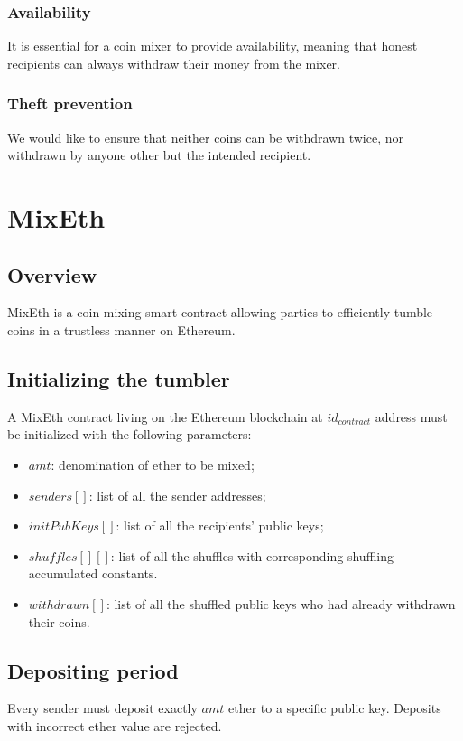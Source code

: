 \documentclass[a4paper]{article}
\theoremstyle{definition}
\begin{document}
\subsubsection{Availability}
It is essential for a coin mixer to provide availability, meaning that honest recipients can always withdraw their money from the mixer.


\subsubsection{Theft prevention}
We would like to ensure that neither coins can be withdrawn twice, nor withdrawn by anyone other but the intended recipient. 
\section{MixEth}

\subsection{Overview}
MixEth is a coin mixing smart contract allowing parties to efficiently tumble coins in a trustless manner on Ethereum.
\subsection{Initializing the tumbler}

A MixEth contract living on the Ethereum blockchain at $id_{contract}$ address must be initialized with the following parameters:
\begin{itemize}
	\item $amt$: denomination of ether to be mixed;
	\item $senders[]$: list of all the sender addresses;
	\item $initPubKeys[]$: list of all the recipients' public keys;
	\item $shuffles[][]$: list of all the shuffles with corresponding shuffling accumulated constants.
	\item $withdrawn[]$: list of all the shuffled public keys who had already withdrawn their coins.	
\end{itemize}

\subsection{Depositing period}
Every sender must deposit exactly $amt$ ether to a specific public key. Deposits with incorrect ether value are rejected.  
\end{document}
